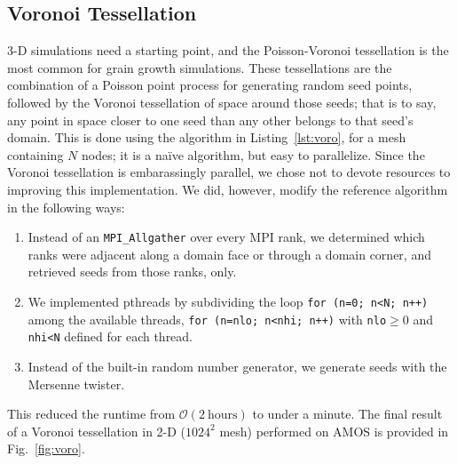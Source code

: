 \documentclass[11pt]{article}
\newcommand{\code}[1]{\colorbox{codebg}{\texttt{\footnotesize{#1}}}}
\begin{document}
\begin{multicols*}{2}
\subsection*{Voronoi Tessellation}
3-D simulations need a starting point, and the Poisson-Voronoi tessellation is the most common for grain growth simulations.
These tessellations are the combination of a Poisson point process for generating random seed points, followed by the Voronoi tessellation of space around those seeds;
that is to say, any point in space closer to one seed than any other belongs to that seed's domain.
This is done using the algorithm in Listing~\ref{lst:voro}, for a mesh containing $N$ nodes; it is a na\"ive algorithm, but easy to parallelize.
Since the Voronoi tessellation is embarassingly parallel, we chose not to devote resources to improving this implementation.
We did, however, modify the reference algorithm in the following ways:
\begin{enumerate}
 \item Instead of an \texttt{MPI\_Allgather} over every MPI rank, we determined which ranks were adjacent along a domain face or through a domain corner, and retrieved seeds from those ranks, only.
 \item We implemented pthreads by subdividing the loop \code{for (n=0; n<N; n++)} among the available threads, \code{for (n=nlo; n<nhi; n++)} with \texttt{nlo}$\geq0$ and \texttt{nhi<N} defined for each thread.
 \item Instead of the built-in random number generator, we generate seeds with the Mersenne twister.
\end{enumerate}
This reduced the runtime from $\mathcal{O}(2\ \mathrm{hours})$ to under a minute.
The final result of a Voronoi tessellation in 2-D ($1024^2$ mesh) performed on AMOS is provided in Fig.~\ref{fig:voro}.


\end{multicols*}
\end{document}
